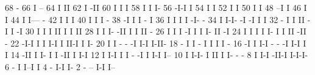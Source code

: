 \begin{Listing}
       68                                  -
       66                                  I  --
       64                                  I  II
       62                                  I -II
       60                                  I I I
       58                                  I I I-
       56                                 -I-I  I
       54                                 I     I
       52                                 I     I
       50                                 I     I
       48                               --I     I
       46                               I       I
       44                               I       I--- -
       42                               I          I I
       40                               I          I I                                -
       38                              -I          I I                          -     I
       36                              I           I I                          I    -I-   -
       34                              I           I-I-                        -I   -I I   I
       32                            - I              I                        II  -I  I  -I
       30                            I I              I                        II  I   I  II
       28                            I I              I-                      -II  I   I  II   -
       26                            I I               I                     -I I  I   I- II  -I
       24                            I I               I                     I  I- I    I II -II -
       22                           -I-I               I                     I   I-I    I II-I I I-
       20                           I                  I                - - -I          I-I    I-II-
       18                         - I                  I -              I I I                      I -
       16                        -I I                  I-I  -       -  -I I-I                      I I
       14                       -II I                    I- I       I -II I                        I-I
       12                       I I-I                     I I  -   -I I I-I                          I--
       10                       I                         I-I- I   II I                                I- - -
        8                       I                            I-I  -II-I                                 I-I-I-
        6                     - I                              I--I                                          I
        4                   - I-I                                                                            I-
        2             -  -- I-I                                                                               I--
 

\end{Listing}
